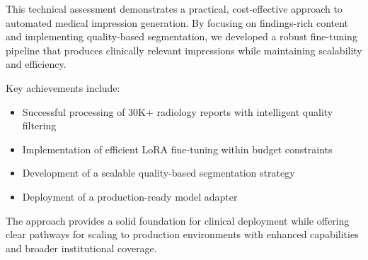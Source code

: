 \documentclass[11pt,letterpaper]{article}
\begin{document}
This technical assessment demonstrates a practical, cost-effective approach to automated medical impression generation. By focusing on findings-rich content and implementing quality-based segmentation, we developed a robust fine-tuning pipeline that produces clinically relevant impressions while maintaining scalability and efficiency.

Key achievements include:
\begin{itemize}
    \item Successful processing of 30K+ radiology reports with intelligent quality filtering
    \item Implementation of efficient LoRA fine-tuning within budget constraints
    \item Development of a scalable quality-based segmentation strategy
    \item Deployment of a production-ready model adapter
\end{itemize}

The approach provides a solid foundation for clinical deployment while offering clear pathways for scaling to production environments with enhanced capabilities and broader institutional coverage.
\end{document}
